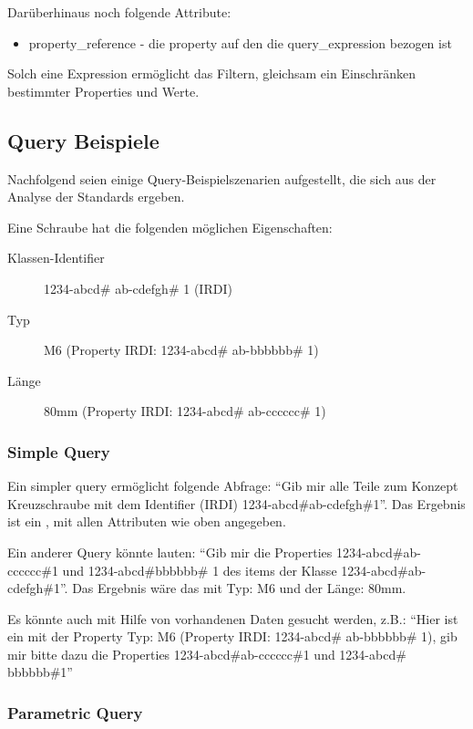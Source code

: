 Darüberhinaus noch folgende Attribute:

\begin{itemize}
\item property\_reference - die property auf den die query\_expression bezogen ist
\end{itemize}
Solch eine Expression ermöglicht das Filtern, gleichsam ein Einschränken bestimmter Properties und Werte. 

\subsection{Query Beispiele}\label{kap:query_beispiele}

Nachfolgend seien einige Query-Beispielszenarien aufgestellt, die sich aus der Analyse der Standards ergeben.

Eine Schraube hat die folgenden möglichen Eigenschaften: 

\begin{description}
\item[Klassen-Identifier] 1234-abcd\# ab-cdefgh\# 1 (IRDI)
\item[Typ] M6 (Property IRDI: 1234-abcd\# ab-bbbbbb\# 1)
\item[Länge] 80mm (Property IRDI: 1234-abcd\# ab-cccccc\# 1)
\end{description}

\subsubsection{Simple Query}

Ein simpler query ermöglicht folgende Abfrage: \enquote{Gib mir alle Teile zum Konzept Kreuzschraube mit dem Identifier (IRDI) 1234-abcd\#ab-cdefgh\#1}. Das Ergebnis ist ein , mit allen Attributen wie oben angegeben. 

Ein anderer Query könnte lauten: \enquote{Gib mir die Properties 1234-abcd\#ab-cccccc\#1 und 1234-abcd\#bbbbbb\# 1 des \glspl{item} der Klasse 1234-abcd\#ab-cdefgh\#1}. Das Ergebnis wäre das  mit Typ: M6 und der Länge: 80mm.

Es könnte auch mit Hilfe von vorhandenen Daten gesucht werden, z.B.:  \enquote{Hier ist ein  mit der Property Typ: M6 (Property IRDI: 1234-abcd\# ab-bbbbbb\# 1), gib mir bitte dazu die Properties 1234-abcd\#ab-cccccc\#1 und 1234-abcd\# bbbbbb\#1} 

\subsubsection{Parametric Query}

